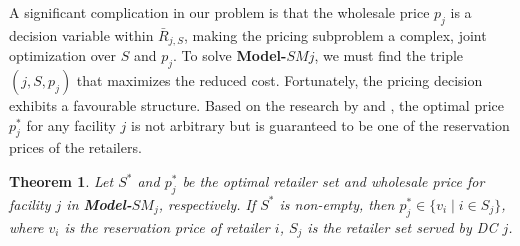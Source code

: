 \documentclass[]{article}
\theoremstyle{plain}%
\newtheorem{theorem}{Theorem}[section]
\theoremstyle{definition}
\theoremstyle{remark}
\theoremstyle{plain}%
\begin{document}
    A significant complication in our problem is that the wholesale price $p_j$ is a decision variable within $\bar{R}_{j,S}$, making the pricing subproblem a complex, joint optimization over $S$ and $p_j$. To solve \textbf{Model-}$SM{j}$, we must find the triple $(j, S, p_j)$ that maximizes the reduced cost. Fortunately, the pricing decision exhibits a favourable structure. Based on the research by \cite{shen2006profit} and \cite{li2014stochastic}, the optimal price $p_j^*$ for any facility $j$ is not arbitrary but is guaranteed to be one of the reservation prices of the retailers.
    
    
    \begin{theorem} \label{thm:price_structure}
    Let $S^*$ and $p_j^*$ be the optimal retailer set and wholesale price for facility $j$ in \textbf{Model-}$SM_{j}$, respectively. If $S^*$ is non-empty, then $p_j^* \in \{v_i \mid i \in S_j \}$, where $v_i$ is the reservation price of retailer $i$, $S_j$ is the retailer set served by DC $j$.
    \end{theorem}
    
\end{document}
